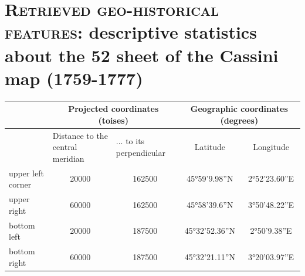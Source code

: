 \documentclass[portrait, A0]{sciposter}
\begin{document}
\vspace{-1cm}
\begin{minipage}[b]{\textwidth}
  \section{\normalfont \textsc{Retrieved geo-historical features}: descriptive statistics about the 52 sheet of the Cassini map (1759-1777)}
  \begin{multicols}{3}
    \setlength{\columnsep}{80pt}
    \footnotesize
    \begin{table}[]
      \begin{center}
      \begin{tabular}{@{}lcccc@{}}
        \toprule
        & \multicolumn{2}{c}{Projected coordinates (toises)}                                                & \multicolumn{2}{c}{Geographic coordinates (degrees)}              \\
        \midrule
    & \multicolumn{1}{l}{Distance to the central meridian} & \multicolumn{1}{l}{... to its perpendicular} & \multicolumn{1}{c}{Latitude} & \multicolumn{1}{c}{Longitude} \\
    upper left corner & \num{20000}                                          & \num{162500}                                 & 45°59'9.98''N                & 2°52'23.60''E                 \\
    upper right       & \num{60000}                                          & \num{162500}                                 & 45°58'39.6''N                & 3°50'48.22''E                 \\
    bottom left      & \num{20000}                                        & \num{187500}                                & 45°32'52.36''N               & 2°50'9.38''E                  \\
    bottom right     & \num{60000}                                          & \num{187500}                                & 45°32'21.11''N               & 3°20'03.97''E                 \\
    \bottomrule
  \end{tabular}
\label{table:translation}
      \end{center}
\end{table}


\end{multicols}
\end{minipage}
\end{document}
